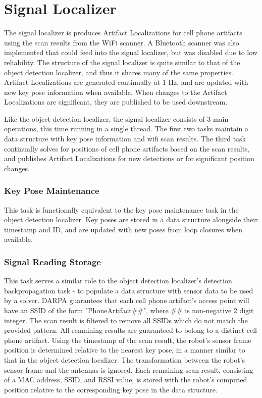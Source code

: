 \section{Signal Localizer}

The signal localizer is produces Artifact Localizations for cell phone artifacts using the scan results from the WiFi scanner. A Bluetooth scanner was also implemented that could feed into the signal localizer, but was disabled due to low reliability. The structure of the signal localizer is quite similar to that of the object detection localizer, and thus it shares many of the same properties. Artifact Localizations are generated continually at 1 Hz, and are updated with new key pose information when available. When changes to the Artifact Localizations are significant, they are published to be used downstream.

Like the object detection localizer, the signal localizer consists of 3 main operations, this time running in a single thread. The first two tasks maintain a data structure with key pose information and wifi scan results. The third task continually solves for positions of cell phone artifacts based on the scan results, and publishes Artifact Localizations for new detections or for significant position changes.

\subsubsection{Key Pose Maintenance}

This task is functionally equivalent to the key pose maintenance task in the object detection localizer. Key poses are stored in a data structure alongside their timestamp and ID, and are updated with new poses from loop closures when available.

\subsubsection{Signal Reading Storage}

This task serves a similar role to the object detection localizer's detection backpropagation task - to populate a data structure with sensor data to be used by a solver. DARPA guarantees that each cell phone artifact's access point will have an SSID of the form "PhoneArtifact\#\#", where \#\# is non-negative 2 digit integer. The scan result is filtered to remove all SSIDs which do not match the provided pattern. All remaining results are guaranteed to belong to a distinct cell phone artifact. Using the timestamp of the scan result, the robot's sensor frame position is determined relative to the nearest key pose, in a manner similar to that in the object detection localizer. The transformation between the robot's sensor frame and the antennas is ignored. Each remaining scan result, consisting of a MAC address, SSID, and RSSI value, is stored with the robot's computed position relative to the corresponding key pose in the data structure.

